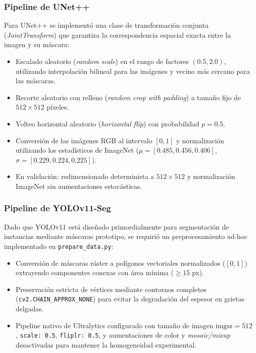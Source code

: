 \documentclass[conference]{IEEEtran}
\begin{document}
\subsubsection{Pipeline de UNet++}

Para UNet++ se implementó una clase de transformación conjunta (\textit{JointTransform}) que garantiza la correspondencia espacial exacta entre la imagen y su máscara:

\begin{itemize}
    \item Escalado aleatorio (\textit{random scale}) en el rango de factores $(0.5, 2.0)$, utilizando interpolación bilineal para las imágenes y vecino más cercano para las máscaras.
    \item Recorte aleatorio con relleno (\textit{random crop with padding}) a tamaño fijo de $512 \times 512$ píxeles.
    \item Volteo horizontal aleatorio (\textit{horizontal flip}) con probabilidad $p = 0.5$.
    \item Conversión de las imágenes RGB al intervalo $[0,1]$ y normalización utilizando los estadísticos de ImageNet ($\mu = [0.485, 0.456, 0.406]$, $\sigma = [0.229, 0.224, 0.225]$).
    \item En validación: redimensionado determinista a $512 \times 512$ y normalización ImageNet sin aumentaciones estocásticas.
\end{itemize}


\subsubsection{Pipeline de YOLOv11-Seg}
Dado que YOLOv11 está diseñado primordialmente para segmentación de instancias mediante máscaras prototipo, se requirió un preprocesamiento ad-hoc implementado en \texttt{prepare\_data.py}:
\begin{itemize}
    \item Conversión de máscaras ráster a polígonos vectoriales normalizados ($[0, 1]$) extrayendo componentes conexas con área mínima ($\ge 15$ px).
    \item Preservación estricta de vértices mediante contornos completos (\texttt{cv2.CHAIN\_APPROX\_NONE}) para evitar la degradación del espesor en grietas delgadas.
    \item Pipeline nativo de Ultralytics configurado con tamaño de imagen $\text{imgsz} = 512$, \texttt{scale: 0.5}, \texttt{fliplr: 0.5}, y aumentaciones de color y \textit{mosaic/mixup} desactivadas para mantener la homogeneidad experimental.
\end{itemize}
\end{document}
